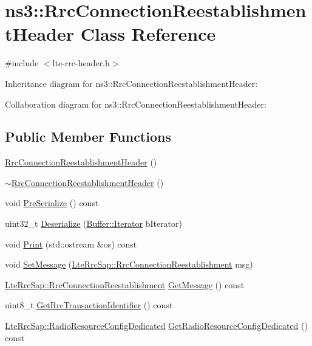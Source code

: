 \hypertarget{classns3_1_1RrcConnectionReestablishmentHeader}{}\section{ns3\+:\+:Rrc\+Connection\+Reestablishment\+Header Class Reference}
\label{classns3_1_1RrcConnectionReestablishmentHeader}


{\ttfamily \#include $<$lte-\/rrc-\/header.\+h$>$}



Inheritance diagram for ns3\+:\+:Rrc\+Connection\+Reestablishment\+Header\+:


Collaboration diagram for ns3\+:\+:Rrc\+Connection\+Reestablishment\+Header\+:
\subsection*{Public Member Functions}
\begin{DoxyCompactItemize}
\item 
\hyperlink{classns3_1_1RrcConnectionReestablishmentHeader_a62b082521a85d1b6eca4318037ccbe3c}{Rrc\+Connection\+Reestablishment\+Header} ()
\item 
\hyperlink{classns3_1_1RrcConnectionReestablishmentHeader_ae69e22ac8d68b8686e58463c4eb79703}{$\sim$\+Rrc\+Connection\+Reestablishment\+Header} ()
\item 
void \hyperlink{classns3_1_1RrcConnectionReestablishmentHeader_a4432a5341e51b7807c2044cd680ecc03}{Pre\+Serialize} () const 
\item 
uint32\+\_\+t \hyperlink{classns3_1_1RrcConnectionReestablishmentHeader_abb843777db19cfbf033e8ffcbc539e5d}{Deserialize} (\hyperlink{classns3_1_1Buffer_1_1Iterator}{Buffer\+::\+Iterator} b\+Iterator)
\item 
void \hyperlink{classns3_1_1RrcConnectionReestablishmentHeader_adcf2bf6148db5b27165613312b131cea}{Print} (std\+::ostream \&os) const 
\item 
void \hyperlink{classns3_1_1RrcConnectionReestablishmentHeader_ab0a4d827375abc6a26c970900c68c8ea}{Set\+Message} (\hyperlink{structns3_1_1LteRrcSap_1_1RrcConnectionReestablishment}{Lte\+Rrc\+Sap\+::\+Rrc\+Connection\+Reestablishment} msg)
\item 
\hyperlink{structns3_1_1LteRrcSap_1_1RrcConnectionReestablishment}{Lte\+Rrc\+Sap\+::\+Rrc\+Connection\+Reestablishment} \hyperlink{classns3_1_1RrcConnectionReestablishmentHeader_a06f99ce5fcf31288c78642a0ebe57251}{Get\+Message} () const 
\item 
uint8\+\_\+t \hyperlink{classns3_1_1RrcConnectionReestablishmentHeader_a7f7797adc6a070d131fc6d3926ef2cd8}{Get\+Rrc\+Transaction\+Identifier} () const 
\item 
\hyperlink{structns3_1_1LteRrcSap_1_1RadioResourceConfigDedicated}{Lte\+Rrc\+Sap\+::\+Radio\+Resource\+Config\+Dedicated} \hyperlink{classns3_1_1RrcConnectionReestablishmentHeader_a7a5995b18791e1260ab712bff7459169}{Get\+Radio\+Resource\+Config\+Dedicated} () const 
\end{DoxyCompactItemize}
